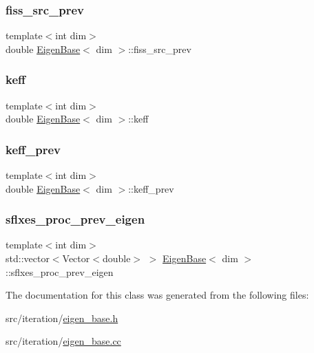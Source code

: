 \subsubsection{\texorpdfstring{fiss\+\_\+src\+\_\+prev}{fiss\_src\_prev}}
{\footnotesize\ttfamily template$<$int dim$>$ \\
double \hyperlink{class_eigen_base}{Eigen\+Base}$<$ dim $>$\+::fiss\+\_\+src\+\_\+prev\hspace{0.3cm}{\ttfamily [protected]}}

\mbox{\label{class_eigen_base_a9373e0bd7462b70829d88b82cb66ac10}} 
\subsubsection{\texorpdfstring{keff}{keff}}
{\footnotesize\ttfamily template$<$int dim$>$ \\
double \hyperlink{class_eigen_base}{Eigen\+Base}$<$ dim $>$\+::keff\hspace{0.3cm}{\ttfamily [protected]}}

\mbox{\label{class_eigen_base_a1499f0cb877e5dff2013328e06a29b4a}} 
\subsubsection{\texorpdfstring{keff\+\_\+prev}{keff\_prev}}
{\footnotesize\ttfamily template$<$int dim$>$ \\
double \hyperlink{class_eigen_base}{Eigen\+Base}$<$ dim $>$\+::keff\+\_\+prev\hspace{0.3cm}{\ttfamily [protected]}}

\mbox{\label{class_eigen_base_aec9885df50ea40a18fd5708061139843}} 
\subsubsection{\texorpdfstring{sflxes\+\_\+proc\+\_\+prev\+\_\+eigen}{sflxes\_proc\_prev\_eigen}}
{\footnotesize\ttfamily template$<$int dim$>$ \\
std\+::vector$<$Vector$<$double$>$ $>$ \hyperlink{class_eigen_base}{Eigen\+Base}$<$ dim $>$\+::sflxes\+\_\+proc\+\_\+prev\+\_\+eigen\hspace{0.3cm}{\ttfamily [protected]}}



The documentation for this class was generated from the following files\+:\begin{DoxyCompactItemize}
\item 
src/iteration/\hyperlink{eigen__base_8h}{eigen\+\_\+base.\+h}\item 
src/iteration/\hyperlink{eigen__base_8cc}{eigen\+\_\+base.\+cc}\end{DoxyCompactItemize}
